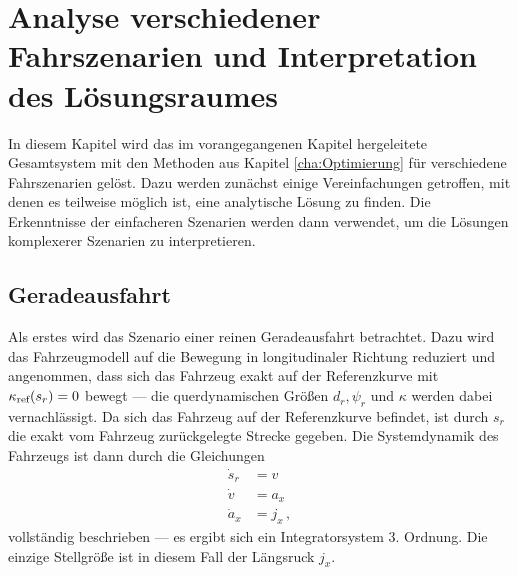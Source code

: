 \chapter{Analyse verschiedener Fahrszenarien und Interpretation des Lösungsraumes}\label{cha:Ergebnisse}
In diesem Kapitel wird das im vorangegangenen Kapitel hergeleitete Gesamtsystem mit den Methoden aus Kapitel \ref{cha:Optimierung} für verschiedene Fahrszenarien gelöst. Dazu werden zunächst einige Vereinfachungen getroffen, mit denen es teilweise möglich ist, eine analytische Lösung zu finden. Die Erkenntnisse der einfacheren Szenarien werden dann verwendet, um die Lösungen komplexerer Szenarien zu interpretieren. 

\section{Geradeausfahrt}
Als erstes wird das Szenario einer reinen Geradeausfahrt betrachtet. Dazu wird das Fahrzeugmodell auf die Bewegung in longitudinaler Richtung reduziert und angenommen, dass sich das Fahrzeug exakt auf der Referenzkurve mit $\kappa_{\textrm{ref}}(s_r) = 0$ bewegt --- die querdynamischen Größen $d_r, \psi_r$ und $\kappa$ werden dabei vernachlässigt. Da sich das Fahrzeug auf der Referenzkurve befindet, ist durch $s_r$ die exakt vom Fahrzeug zurückgelegte Strecke gegeben. Die Systemdynamik des Fahrzeugs ist dann durch die Gleichungen 
\begin{align}
\dot{s}_r &= v \\
\dot{v} &= a_x \\
\dot{a}_x &= j_x \,,
\end{align}
vollständig beschrieben --- es ergibt sich ein Integratorsystem 3. Ordnung. Die einzige Stellgröße ist in diesem Fall der Längsruck $j_x$.

